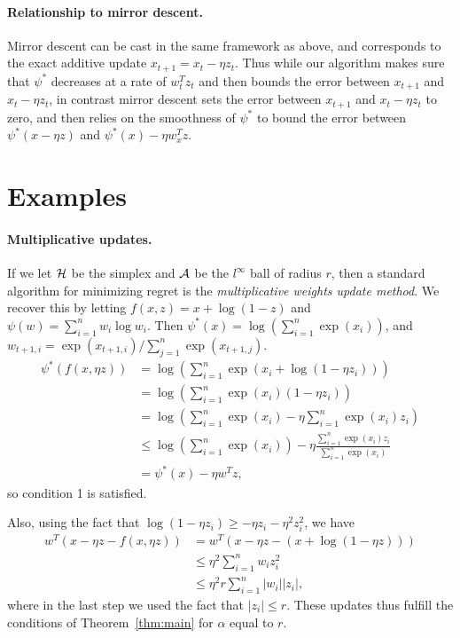 \documentclass[11pt]{article}
\begin{document}
\paragraph{Relationship to mirror descent.} Mirror descent can be cast in the same framework as above, 
and corresponds to the exact additive update $x_{t+1} = x_t - \eta z_t$. Thus while our algorithm 
makes sure that $\psi^*$ decreases at a rate of $w_t^Tz_t$ and then bounds the error between 
$x_{t+1}$ and $x_t - \eta z_t$, in contrast mirror descent sets the error between $x_{t+1}$ and 
$x_t - \eta z_t$ to zero, and then relies on the smoothness of $\psi^*$ to bound the error between 
$\psi^*(x-\eta z)$ and $\psi^*(x) - \eta w_x^Tz$.
\section{Examples}
\paragraph{Multiplicative updates.} If we let $\mathcal{H}$ be the simplex and $\mathcal{A}$ be the 
$l^{\infty}$ ball of radius $r$, then a standard algorithm for minimizing regret is the 
\emph{multiplicative weights update method}. We recover this by letting $f(x,z) = x + \log(1-z)$ 
and $\psi(w) = \sum_{i=1}^n w_i\log w_i$. Then $\psi^*(x) = \log\left(\sum_{i=1}^n \exp(x_i)\right)$, 
and $w_{t+1,i} = \exp(x_{t+1,i})/\sum_{j=1}^n \exp(x_{t+1,j})$.
\begin{align*}
\psi^*(f(x,\eta z)) &= \log\left(\sum_{i=1}^n \exp(x_i + \log(1-\eta z_i))\right) \\
 &= \log\left(\sum_{i=1}^n \exp(x_i)(1-\eta z_i)\right) \\
 &= \log\left(\sum_{i=1}^n \exp(x_i) - \eta \sum_{i=1}^n \exp(x_i) z_i\right) \\
 &\leq \log\left(\sum_{i=1}^n \exp(x_i)\right) - \eta \frac{\sum_{i=1}^n \exp(x_i) z_i}{\sum_{i=1}^n \exp(x_i)} \\
 &= \psi^*(x) - \eta w^Tz,
\end{align*}
so condition 1 is satisfied.

Also, using the fact that $\log(1-\eta z_i) \geq -\eta z_i - \eta^2 z_i^2$, we have
\begin{align*}
w^T(x-\eta z - f(x, \eta z)) &= w^T(x-\eta z - (x + \log(1-\eta z))) \\
 &\leq \eta^2 \sum_{i=1}^n w_iz_i^2 \\
 &\leq \eta^2 r \sum_{i=1}^n |w_i||z_i|,
\end{align*}
where in the last step we used the fact that $|z_i| \leq r$. These updates 
thus fulfill the conditions of Theorem~\ref{thm:main} for $\alpha$ equal to 
$r$.
\end{document}
